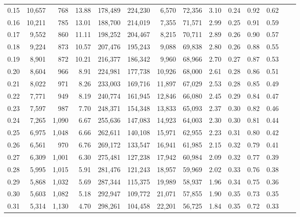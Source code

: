 \begin{tabular}{rrrrrrrrrrrrrr}
0.15 &  10,657 &    768 &   13.88 &  178,489 &  224,230 &   6,570 &  72,356 &  3.10 &  0.24 &  0.92 &      0.62 \\
0.16 &  10,211 &    785 &   13.01 &  188,700 &  214,019 &   7,355 &  71,571 &  2.99 &  0.25 &  0.91 &      0.59 \\
0.17 &   9,552 &    860 &   11.11 &  198,252 &  204,467 &   8,215 &  70,711 &  2.89 &  0.26 &  0.90 &      0.57 \\
0.18 &   9,224 &    873 &   10.57 &  207,476 &  195,243 &   9,088 &  69,838 &  2.80 &  0.26 &  0.88 &      0.55 \\
0.19 &   8,901 &    872 &   10.21 &  216,377 &  186,342 &   9,960 &  68,966 &  2.70 &  0.27 &  0.87 &      0.53 \\
0.20 &   8,604 &    966 &    8.91 &  224,981 &  177,738 &  10,926 &  68,000 &  2.61 &  0.28 &  0.86 &      0.51 \\
0.21 &   8,022 &    971 &    8.26 &  233,003 &  169,716 &  11,897 &  67,029 &  2.53 &  0.28 &  0.85 &      0.49 \\
0.22 &   7,771 &    949 &    8.19 &  240,774 &  161,945 &  12,846 &  66,080 &  2.45 &  0.29 &  0.84 &      0.47 \\
0.23 &   7,597 &    987 &    7.70 &  248,371 &  154,348 &  13,833 &  65,093 &  2.37 &  0.30 &  0.82 &      0.46 \\
0.24 &   7,265 &  1,090 &    6.67 &  255,636 &  147,083 &  14,923 &  64,003 &  2.30 &  0.30 &  0.81 &      0.44 \\
0.25 &   6,975 &  1,048 &    6.66 &  262,611 &  140,108 &  15,971 &  62,955 &  2.23 &  0.31 &  0.80 &      0.42 \\
0.26 &   6,561 &    970 &    6.76 &  269,172 &  133,547 &  16,941 &  61,985 &  2.15 &  0.32 &  0.79 &      0.41 \\
0.27 &   6,309 &  1,001 &    6.30 &  275,481 &  127,238 &  17,942 &  60,984 &  2.09 &  0.32 &  0.77 &      0.39 \\
0.28 &   5,995 &  1,015 &    5.91 &  281,476 &  121,243 &  18,957 &  59,969 &  2.02 &  0.33 &  0.76 &      0.38 \\
0.29 &   5,868 &  1,032 &    5.69 &  287,344 &  115,375 &  19,989 &  58,937 &  1.96 &  0.34 &  0.75 &      0.36 \\
0.30 &   5,603 &  1,082 &    5.18 &  292,947 &  109,772 &  21,071 &  57,855 &  1.90 &  0.35 &  0.73 &      0.35 \\
0.31 &   5,314 &  1,130 &    4.70 &  298,261 &  104,458 &  22,201 &  56,725 &  1.84 &  0.35 &  0.72 &      0.33 \\

\end{tabular}
